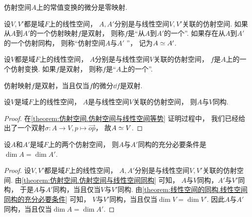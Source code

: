 \begin{proposition}%
仿射空间\(A\)上的常值变换的微分是零映射.
\end{proposition}

\begin{definition}%
设\(V,V'\)都是域\(F\)上的线性空间，
\(A,A'\)分别是与线性空间\(V,V'\)关联的仿射空间.
如果从\(A\)到\(A'\)的一个仿射映射\(f\)是双射，
则称\(f\)是“从\(A\)到\(A'\)的一个”.
如果存在从\(A\)到\(A'\)的一个仿射同构，
则称“仿射空间\(A\)与\(A'\) ”，
记为\(A \simeq A'\).
\end{definition}

\begin{definition}%
设\(V\)都是域\(F\)上的线性空间，
\(A\)分别是与线性空间\(V\)关联的仿射空间，
\(f\)是\(A\)上的一个仿射变换.
如果\(f\)是双射，
则称\(f\)是“\(A\)上的一个”.
\end{definition}

\begin{proposition}%
仿射映射\(f\)是双射，当且仅当\(f\)的微分\(\dd{f}\)是双射.
\end{proposition}

\begin{proposition}\label{theorem:仿射空间.仿射空间与线性空间同构}
设\(V\)是域\(F\)上的线性空间，
\(A\)是与线性空间\(V\)关联的仿射空间，
则\(A\)与\(V\)同构.
\begin{proof}
在\cref{theorem:仿射空间.仿射空间与线性空间等势} 证明过程中，
我们已经给出了一个双射\(\sigma\colon A \to V, p \mapsto \vec{op}\)，
故\(A \simeq V\).
\end{proof}
\end{proposition}

\begin{proposition}%
设\(A\)和\(A'\)是域\(F\)上的两个仿射空间，
则\(A\)与\(A'\)同构的充分必要条件是\(\dim A = \dim A'\).
\begin{proof}
设\(V,V'\)都是域\(F\)上的线性空间，
\(A,A'\)分别是与线性空间\(V,V'\)关联的仿射空间.
由\cref{theorem:仿射空间.仿射空间与线性空间同构} 可知，
\(A\)与\(V\)同构，\(A'\)与\(V'\)同构，
于是\(A\)与\(A'\)同构，当且仅当\(V\)与\(V'\)同构.
由\cref{theorem:线性空间的同构.线性空间同构的充分必要条件} 可知，
\(V\)与\(V'\)同构，当且仅当\(\dim V = \dim V'\).
因此\(A\)与\(A'\)同构，当且仅当\(\dim A = \dim A'\).
\end{proof}
\end{proposition}

